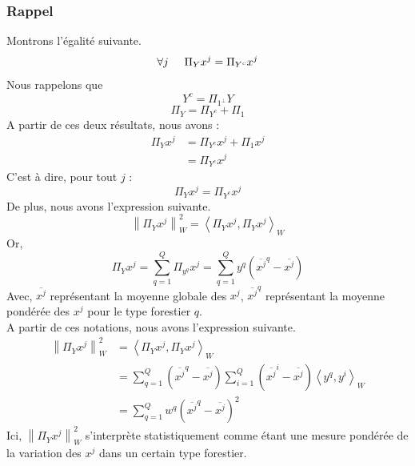 \documentclass{article}
\begin{document}
\subsubsection{Rappel}
Montrons l'égalité suivante. \\
\[
\forall j \hspace{0.5cm} \Pi_Y x^j = \Pi_{Y^c} x^j
\]
Nous rappelons que 
\[
Y^c = \Pi_{1^\perp} Y 
\]
\[
\Pi_Y = \Pi_{Y^c} + \Pi_1
\]
A partir de ces deux résultats, nous avons : \\
\begin{align*}
    \Pi_Y x^j & = \Pi_{Y^c} x^j + \Pi_1 x^j \\
    &= \Pi_{Y^c} x^j
\end{align*}
C'est à dire, pour tout $j$ : 
\[
\Pi_Y x^j = \Pi_{Y^c} x^j
\]
De plus, nous avons l'expression suivante.
\[
\left\lVert \Pi_Y x^j \right\rVert^2 _W = \left\langle \Pi_Y x^j,\Pi_Y x^j\right\rangle_W
\]
Or,
\[
\Pi_Y x^j=\sum_{q = 1}^{Q}\Pi_{y^q} x^j=\sum_{q = 1}^{Q}y^q( \overline{x^j}^q - {\overline{x^j}} )  
\]
Avec, $\overline{x^j}$ représentant la moyenne globale des $x^j$, $\overline{x^j}^q$ représentant la moyenne pondérée des $x^j$ pour le type forestier $q$.\\
A partir de ces notations, nous avons l'expression suivante.
\begin{align*}
    \left\lVert \Pi_Y x^j \right\rVert^2 _W &= \left\langle \Pi_Y x^j,\Pi_Y x^j\right\rangle_W \\
     &=  \sum_{q = 1}^{Q}( \overline{x^j}^q - {\overline{x^j}} ) \sum_{ i= 1}^{Q}( \overline{x^j}^i - {\overline{x^j}} )\left\langle y^q,y^i\right\rangle_W \\
     &= \sum_{q = 1}^{Q}w^q( \overline{x^j}^q - {\overline{x^j}} )^2
\end{align*}
Ici, $\left\lVert \Pi_Y x^j \right\rVert^2 _W$ s'interprète statistiquement comme
étant une mesure pondérée de la variation des $x^j$ dans un certain type forestier.
\\
\\
\end{document}
